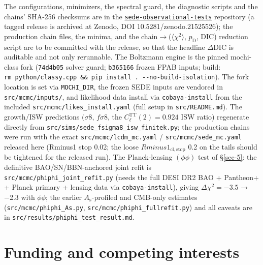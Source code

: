 \documentclass[preprint,12pt]{elsarticle}
\begin{document}
The configurations, minimizers, the spectral guard, the diagnostic
scripts and the chains' SHA-256 checksums are in the
\href{https://github.com/spsingularity/sede-observational-tests}{\texttt{sede-observational-tests}}
repository (a tagged release is archived at Zenodo, DOI
10.5281/zenodo.21525526); the production chain files, the minima, and
the chain\(\to\)(\(\langle\chi^2\rangle\), \(p_{\mathrm{D}}\), DIC)
reduction script are to be committed with the release, so that the
headline \(\Delta \mathrm{DIC}\) is auditable and not only rerunnable.
The Boltzmann engine is the pinned mochi-class fork (\texttt{74d4b05}
solver guard; \texttt{b365166} frozen FPAB inputs; build:
\texttt{rm\ python/\allowbreak classy.\allowbreak cpp\ \&\&\ pip\ install\ .\allowbreak \ -\/\allowbreak -no-build-isolation}).
The fork location is set via \texttt{MOCHI\_\allowbreak DIR}, the frozen SEDE inputs
are vendored in \texttt{src/\allowbreak mcmc/\allowbreak inputs/\allowbreak }, and likelihood data install
via \texttt{cobaya-install} from the included
\texttt{src/\allowbreak mcmc/\allowbreak likes\_\allowbreak install.\allowbreak yaml} (full setup in
\texttt{src/\allowbreak README.\allowbreak md}). The growth/ISW predictions \((\sigma 8\),
\(f\sigma 8\), the \(C_\ell ^\mathrm{TT}(2)=0.924\) ISW ratio)
regenerate directly from
\texttt{src/\allowbreak sims/\allowbreak sede\_\allowbreak fsigma8\_\allowbreak isw\_\allowbreak finitek.\allowbreak py}; the production chains
were run with the exact \texttt{src/\allowbreak mcmc/\allowbreak lcdm\_\allowbreak mc.\allowbreak yaml} /
\texttt{src/\allowbreak mcmc/\allowbreak sede\_\allowbreak mc.\allowbreak yaml} released here (Rminus1 stop 0.02; the
loose \(Rminus1_{\mathrm{cl},\mathrm{stop}}\) 0.2 on the tails should
be tightened for the released run). The Planck-lensing \((\phi \phi )\)
test of §\ref{sec-5}: the definitive BAO/SN/BBN-anchored joint refit is
\texttt{src/\allowbreak mcmc/\allowbreak phiphi\_\allowbreak joint\_\allowbreak refit.\allowbreak py} (needs the full DESI DR2 BAO +
Pantheon+ + Planck primary + lensing data via \texttt{cobaya-install}),
giving \(\Delta \chi ^{2} = -3.5\) → −2.3 with \(\phi \phi\); the
earlier \(A_{\mathrm{s}}\)-profiled and CMB-only estimates
(\texttt{src/\allowbreak mcmc/\allowbreak phiphi\_\allowbreak As.\allowbreak py},
\texttt{src/\allowbreak mcmc/\allowbreak phiphi\_\allowbreak fullrefit.\allowbreak py}) and all caveats are in
\texttt{src/\allowbreak results/\allowbreak phiphi\_\allowbreak test\_\allowbreak result.\allowbreak md}.

\section*{Funding and competing
interests}\label{funding-and-competing-interests}
\end{document}
